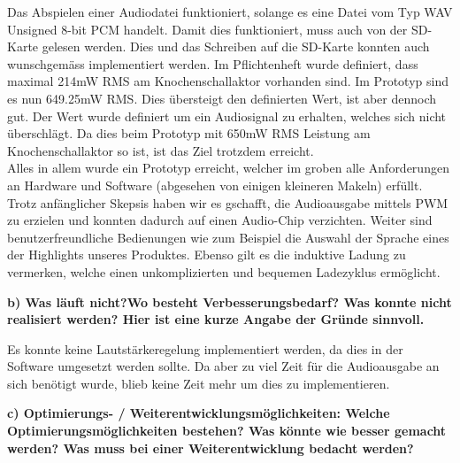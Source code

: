 Das Abspielen einer Audiodatei funktioniert, solange es eine Datei vom Typ WAV Unsigned 8-bit PCM handelt. Damit dies funktioniert, muss auch von der SD-Karte gelesen werden. Dies und das Schreiben auf die SD-Karte konnten auch wunschgemäss implementiert werden. Im Pflichtenheft wurde definiert, dass maximal 214mW RMS am Knochenschallaktor vorhanden sind. Im Prototyp sind es nun 649.25mW RMS. Dies übersteigt den definierten Wert, ist aber dennoch gut. Der Wert wurde definiert um ein Audiosignal zu erhalten, welches sich nicht überschlägt. Da dies beim Prototyp mit 650mW RMS Leistung am Knochenschallaktor so ist, ist das Ziel trotzdem erreicht. \\
 
Alles in allem wurde ein Prototyp erreicht, welcher im groben alle Anforderungen an Hardware und Software (abgesehen von einigen kleineren Makeln) erfüllt. Trotz anfänglicher Skepsis haben wir es gschafft, die Audioausgabe mittels PWM zu erzielen und konnten dadurch auf einen Audio-Chip verzichten. Weiter sind benutzerfreundliche Bedienungen wie zum Beispiel die Auswahl der Sprache eines der Highlights unseres Produktes. Ebenso gilt es die induktive Ladung zu vermerken, welche einen unkomplizierten und bequemen Ladezyklus ermöglicht.

\textbf{b) Was läuft nicht?Wo besteht Verbesserungsbedarf? Was konnte nicht realisiert werden? Hier ist eine kurze Angabe der Gründe sinnvoll.}

Es konnte keine Lautstärkeregelung implementiert werden, da dies in der Software umgesetzt werden sollte. Da aber zu viel Zeit für die Audioausgabe an sich benötigt wurde, blieb keine Zeit mehr um dies zu implementieren.  
 
 
\textbf{c) Optimierungs- / Weiterentwicklungsmöglichkeiten: Welche Optimierungsmöglichkeiten bestehen? Was könnte wie besser gemacht werden? Was muss bei einer Weiterentwicklung bedacht werden?}

